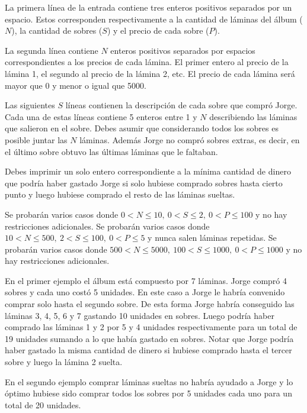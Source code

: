 \documentclass{oci}
\begin{document}
\begin{inputDescription}
La primera línea de la entrada contiene tres enteros positivos separados por un espacio.
Estos corresponden respectivamente a la cantidad de láminas del álbum ($N$), la cantidad de sobres ($S$) y el precio de cada sobre ($P$).

La segunda línea contiene $N$ enteros positivos separados por espacios correspondientes a los precios de cada lámina.
El primer entero al precio de la lámina 1, el segundo al precio de la lámina 2, etc.
El precio de cada lámina será mayor que 0 y menor o igual que 5000.

Las siguientes $S$ líneas contienen la descripción de cada sobre que compró Jorge.
Cada una de estas líneas contiene 5 enteros entre 1 y $N$ describiendo las láminas que salieron en el sobre.
Debes asumir que considerando todos los sobres es posible juntar las $N$ láminas. 
Además Jorge no compró sobres extras, es decir, en el último sobre obtuvo las últimas láminas que le faltaban.
\end{inputDescription}

\begin{outputDescription}
Debes imprimir un solo entero correspondiente a la mínima cantidad de dinero que podría haber gastado Jorge si solo hubiese comprado sobres hasta cierto punto y luego hubiese comprado el resto de las láminas sueltas.
\end{outputDescription}

\begin{scoreDescription}
   Se probarán varios casos donde
 $0 < N \leq 10,\ 0 < S \leq 2,\ 0 < P \leq 100$ y no hay restricciones adicionales.
   Se probarán varios casos donde
 $10 < N \leq 500,\ 2 < S \leq 100,\ 0<P\leq 5 $ y nunca salen láminas repetidas.
   Se probarán varios casos donde
 $500<N\leq 5000,\ 100 < S \leq 1000,\ 0<P\leq 1000$ y no hay restricciones adicionales.
\end{scoreDescription}

\begin{sampleDescription}

En el primer ejemplo el álbum está compuesto por 7 láminas.
Jorge compró 4 sobres y cada uno costó 5 unidades.
En este caso a Jorge le habría convenido comprar solo hasta el segundo sobre.
De esta forma Jorge habría conseguido las láminas 3, 4, 5, 6 y 7 gastando 10 unidades en sobres.
Luego podría haber comprado las láminas 1 y 2 por 5 y 4 unidades respectivamente para un total de 19 unidades sumando a lo que había gastado en sobres.
Notar que Jorge podría haber gastado la misma cantidad de dinero si hubiese comprado hasta el tercer sobre y luego la lámina 2 suelta.

En el segundo ejemplo comprar láminas sueltas no habría ayudado a Jorge y lo óptimo hubiese sido comprar todos los sobres por 5 unidades cada uno para un total de 20 unidades.

\end{sampleDescription}
\end{document}
